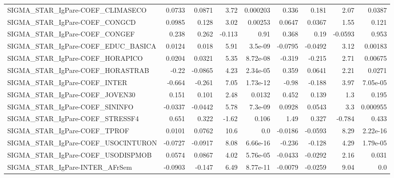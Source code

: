 \begin{tabular}{lrrrrrrrr}
SIGMA\_STAR\_IgPare-COEF\_CLIMASECO      &      0.0733 &       0.0871 &    3.72 & 0.000203 &      0.336 &       0.181 &         2.07 &        0.0387 \\
SIGMA\_STAR\_IgPare-COEF\_CONGCD         &      0.0985 &        0.128 &    3.02 &  0.00253 &     0.0647 &      0.0367 &         1.55 &         0.121 \\
SIGMA\_STAR\_IgPare-COEF\_CONGEF         &       0.238 &        0.262 &  -0.113 &     0.91 &      0.368 &        0.19 &      -0.0593 &         0.953 \\
SIGMA\_STAR\_IgPare-COEF\_EDUC\_BASICA    &      0.0124 &        0.018 &    5.91 &  3.5e-09 &    -0.0795 &     -0.0492 &         3.12 &       0.00183 \\
SIGMA\_STAR\_IgPare-COEF\_HORAPICO       &      0.0204 &       0.0321 &    5.35 & 8.72e-08 &     -0.319 &      -0.215 &         2.71 &       0.00675 \\
SIGMA\_STAR\_IgPare-COEF\_HORASTRAB      &       -0.22 &      -0.0865 &    4.23 & 2.34e-05 &      0.359 &      0.0641 &         2.21 &        0.0271 \\
SIGMA\_STAR\_IgPare-COEF\_INTER          &      -0.664 &       -0.261 &    7.05 & 1.73e-12 &      -0.98 &      -0.188 &         3.97 &      7.05e-05 \\
SIGMA\_STAR\_IgPare-COEF\_JOVEN30        &       0.151 &        0.101 &    2.48 &   0.0132 &      0.452 &       0.139 &          1.3 &         0.195 \\
SIGMA\_STAR\_IgPare-COEF\_SININFO        &     -0.0337 &      -0.0442 &    5.78 &  7.3e-09 &     0.0928 &      0.0543 &          3.3 &      0.000955 \\
SIGMA\_STAR\_IgPare-COEF\_STRESSF4       &       0.651 &        0.322 &   -1.62 &    0.106 &       1.49 &       0.327 &       -0.784 &         0.433 \\
SIGMA\_STAR\_IgPare-COEF\_TPROF          &      0.0101 &       0.0762 &    10.6 &      0.0 &    -0.0186 &     -0.0593 &         8.29 &      2.22e-16 \\
SIGMA\_STAR\_IgPare-COEF\_USOCINTURON    &     -0.0727 &      -0.0917 &    8.08 & 6.66e-16 &     -0.236 &      -0.128 &         4.29 &      1.79e-05 \\
SIGMA\_STAR\_IgPare-COEF\_USODISPMOB     &      0.0574 &       0.0867 &    4.02 & 5.76e-05 &    -0.0433 &     -0.0292 &         2.16 &         0.031 \\
SIGMA\_STAR\_IgPare-INTER\_AFrSem        &     -0.0903 &       -0.147 &    6.49 & 8.77e-11 &    -0.0079 &     -0.0259 &         9.04 &           0.0 \\

\end{tabular}
